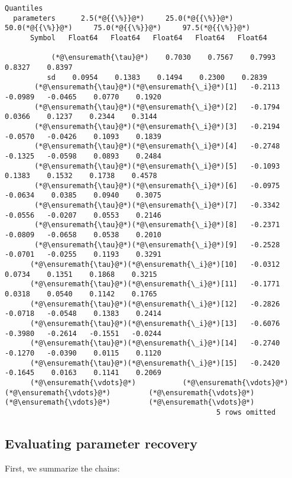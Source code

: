 \documentclass[12pt,a4paper]{article}
\begin{document}
\begin{lstlisting}
Quantiles
  parameters      2.5(*@{{\%}}@*)     25.0(*@{{\%}}@*)     50.0(*@{{\%}}@*)     75.0(*@{{\%}}@*)     97.5(*@{{\%}}@*)
      Symbol   Float64   Float64   Float64   Float64   Float64

           (*@\ensuremath{\tau}@*)    0.7030    0.7567    0.7993    0.8327    0.8397
          sd    0.0954    0.1383    0.1494    0.2300    0.2839
       (*@\ensuremath{\tau}@*)(*@\ensuremath{\_i}@*)[1]   -0.2113   -0.0989   -0.0465    0.0770    0.1920
       (*@\ensuremath{\tau}@*)(*@\ensuremath{\_i}@*)[2]   -0.1794    0.0366    0.1237    0.2344    0.3144
       (*@\ensuremath{\tau}@*)(*@\ensuremath{\_i}@*)[3]   -0.2194   -0.0570   -0.0426    0.1093    0.1839
       (*@\ensuremath{\tau}@*)(*@\ensuremath{\_i}@*)[4]   -0.2748   -0.1325   -0.0598    0.0893    0.2484
       (*@\ensuremath{\tau}@*)(*@\ensuremath{\_i}@*)[5]   -0.1093    0.1383    0.1532    0.1738    0.4578
       (*@\ensuremath{\tau}@*)(*@\ensuremath{\_i}@*)[6]   -0.0975   -0.0634    0.0385    0.0940    0.3075
       (*@\ensuremath{\tau}@*)(*@\ensuremath{\_i}@*)[7]   -0.3342   -0.0556   -0.0207    0.0553    0.2146
       (*@\ensuremath{\tau}@*)(*@\ensuremath{\_i}@*)[8]   -0.2371   -0.0809   -0.0658    0.0538    0.2010
       (*@\ensuremath{\tau}@*)(*@\ensuremath{\_i}@*)[9]   -0.2528   -0.0701   -0.0255    0.1193    0.3291
      (*@\ensuremath{\tau}@*)(*@\ensuremath{\_i}@*)[10]   -0.0312    0.0734    0.1351    0.1868    0.3215
      (*@\ensuremath{\tau}@*)(*@\ensuremath{\_i}@*)[11]   -0.1771    0.0318    0.0540    0.1142    0.1765
      (*@\ensuremath{\tau}@*)(*@\ensuremath{\_i}@*)[12]   -0.2826   -0.0718   -0.0548    0.1383    0.2414
      (*@\ensuremath{\tau}@*)(*@\ensuremath{\_i}@*)[13]   -0.6076   -0.3980   -0.2614   -0.1551   -0.0244
      (*@\ensuremath{\tau}@*)(*@\ensuremath{\_i}@*)[14]   -0.2740   -0.1270   -0.0390    0.0115    0.1120
      (*@\ensuremath{\tau}@*)(*@\ensuremath{\_i}@*)[15]   -0.2420   -0.1645    0.0163    0.1141    0.2069
      (*@\ensuremath{\vdots}@*)           (*@\ensuremath{\vdots}@*)         (*@\ensuremath{\vdots}@*)         (*@\ensuremath{\vdots}@*)         (*@\ensuremath{\vdots}@*)         (*@\ensuremath{\vdots}@*)
                                                  5 rows omitted
\end{lstlisting}


\subsection{Evaluating parameter recovery}
First, we summarize the chains:
\end{document}
